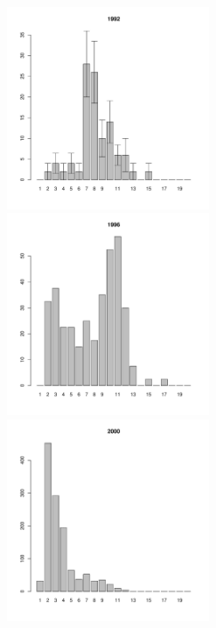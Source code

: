 \documentclass[12pt, a4paper]{article}
\begin{document}
\begin{figure}[h]

\begin{multicols}{3}
\hfill
\includegraphics[width=60mm]{../White_Sea/Luvenga_Goreliy/middle_1992_.pdf}
\hfill
\includegraphics[width=60mm]{../White_Sea/Luvenga_Goreliy/middle_1996_.pdf}
\hfill
\includegraphics[width=60mm]{../White_Sea/Luvenga_Goreliy/middle_2000_.pdf}
\end{multicols}




\end{figure}
\end{document}
